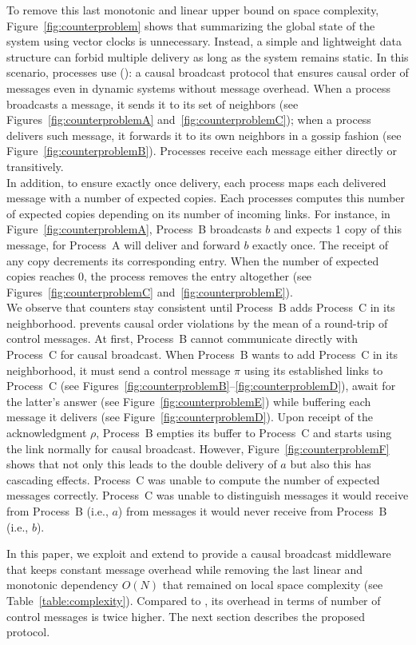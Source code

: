 To remove this last monotonic and linear upper bound on space complexity,
Figure~\ref{fig:counterproblem} shows that summarizing the global state of the
system using vector clocks is unnecessary. Instead, a simple and lightweight
data structure can forbid multiple delivery as long as the system remains
static. In this scenario, processes use \PCBROADCAST (\REF): a causal broadcast
protocol that ensures causal order of messages even in dynamic systems without
message overhead.  When a process broadcasts a message, it sends it to its set
of neighbors (see Figures~\ref{fig:counterproblemA}
and~\ref{fig:counterproblemC}); when a process delivers such message, it
forwards it to its own neighbors in a gossip fashion (see
Figure~\ref{fig:counterproblemB}). Processes receive each message either
directly or transitively.\\
In addition, to ensure exactly once delivery, each process maps each delivered
message with a number of expected copies. Each processes computes this number of
expected copies depending on its number of incoming links. For instance, in
Figure~\ref{fig:counterproblemA}, Process~B broadcasts $b$ and expects 1 copy of
this message, for Process~A will deliver and forward $b$ exactly once. The
receipt of any copy decrements its corresponding entry.  When the number of
expected copies reaches 0, the process removes the entry altogether (see
Figures~\ref{fig:counterproblemC} and~\ref{fig:counterproblemE}).\\ We observe
that counters stay consistent until Process~B adds Process~C in its
neighborhood. \PCBROADCAST prevents causal order violations by the mean of a
round-trip of control messages.  At first, Process~B cannot communicate directly
with Process~C for causal broadcast. When Process~B wants to add Process~C in
its neighborhood, it must send a control message $\pi$ using its established
links to Process~C (see
Figures~\ref{fig:counterproblemB}--\ref{fig:counterproblemD}), await for the
latter's answer (see Figure~\ref{fig:counterproblemE}) while buffering each
message it delivers (see Figure~\ref{fig:counterproblemD}). Upon receipt of the
acknowledgment $\rho$, Process~B empties its buffer to Process~C and starts
using the link normally for causal broadcast. However,
Figure~\ref{fig:counterproblemF} shows that not only this leads to the double
delivery of $a$ but also this has cascading effects. Process~C was unable to
compute the number of expected messages correctly. Process~C was unable to
distinguish messages it would receive from Process~B (i.e., $a$) from messages
it would never receive from Process~B (i.e., $b$).

In this paper, we exploit and extend \PCBROADCAST to provide a causal broadcast
middleware that keeps constant message overhead while removing the last linear
and monotonic dependency $O(N)$ that remained on local space complexity (see
Table~\ref{table:complexity}). Compared to \PCBROADCAST, its overhead in terms
of number of control messages is twice higher.  The next section describes the
proposed protocol.


